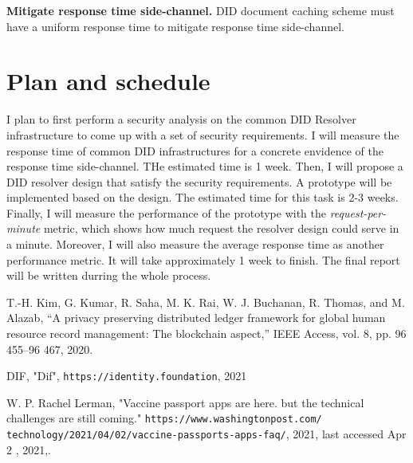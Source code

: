 \documentclass[11pt]{article}
\begin{document}
\textbf{Mitigate response time side-channel.} DID document caching scheme must have a uniform response time to mitigate response time side-channel.

\section{Plan and schedule}
\label{sec:org86a35dc}
I plan to first perform a security analysis on the common DID Resolver infrastructure to come up with a set of security requirements. I will measure the response time of common DID infrastructures for a concrete envidence of the response time side-channel. THe estimated time is 1 week.
Then, I will propose a DID resolver design that satisfy the security requirements. A prototype will be implemented based on the design. The estimated time for this task is 2-3 weeks.
Finally, I will measure the performance of the prototype with the \emph{request-per-minute} metric, which shows how much request the resolver design could serve in a minute. Moreover, I will also measure the average response time as another performance metric. It will take approximately 1 week to finish.
The final report will be written durring the whole process.




\begin{latex}
\begin{thebibliography}{9}


T.-H. Kim, G. Kumar, R. Saha, M. K. Rai, W. J. Buchanan, R. Thomas,
and M. Alazab, “A privacy preserving distributed ledger framework for
global human resource record management: The blockchain aspect,”
IEEE Access, vol. 8, pp. 96 455–96 467, 2020.

DIF, "Dif",
\texttt{https://identity.foundation}, 2021

W. P. Rachel Lerman, "Vaccine passport apps are here. but the technical challenges are still coming."
\texttt{https://www.washingtonpost.com/
technology/2021/04/02/vaccine-passports-apps-faq/}, 2021, last accessed
Apr 2 , 2021,.

\end{thebibliography}
\end{latex}
\end{document}
